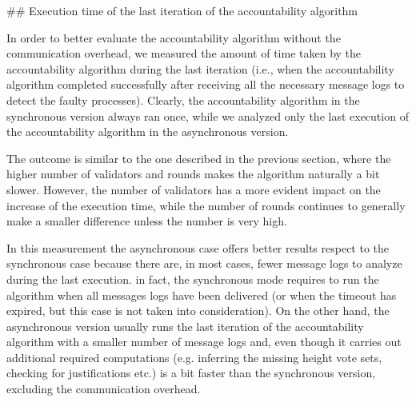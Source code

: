 \documentclass[a4paper,11pt,oneside]{report}
\begin{document}
\begin{markdown}

## Execution time of the last iteration of the accountability algorithm

In order to better evaluate the accountability algorithm without the communication overhead, we measured the amount of time taken by the accountability algorithm during the last iteration (i.e., when the accountability algorithm completed successfully after receiving all the necessary message logs to detect the faulty processes).
Clearly, the accountability algorithm in the synchronous version always ran once, while we analyzed only the last execution of the accountability algorithm in the asynchronous version.

The outcome is similar to the one described in the previous section, where the higher number of validators and rounds makes the algorithm naturally a bit slower.
However, the number of validators has a more evident impact on the increase of the execution time, while the number of rounds continues to generally make a smaller difference unless the number is very high.

In this measurement the asynchronous case offers better results respect to the synchronous case because there are, in most cases, fewer message logs to analyze during the last execution.
in fact, the synchronous mode requires to run the algorithm when all messages logs have been delivered (or when the timeout has expired, but this case is not taken into consideration). 
On the other hand, the asynchronous version usually runs the last iteration of the accountability algorithm with a smaller number of message logs and, even though it carries out additional required computations (e.g. inferring the missing height vote sets, checking for justifications etc.) is a bit faster than the synchronous version, excluding the communication overhead.

\end{markdown}
\end{document}
